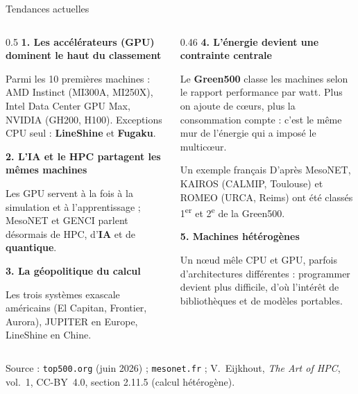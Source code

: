 \documentclass[8pt,aspectratio=169]{beamer}
\newcommand{\src}[1]{\vfill{\tiny\color{gray}Source : #1\par}}
\newcommand{\eij}{V.~Eijkhout, \emph{The Art of HPC}, vol.~1, CC-BY~4.0}
\begin{document}
\begin{frame}{Tendances actuelles}
\begin{columns}[T]
\begin{column}{0.5\textwidth}
\textbf{1. Les accélérateurs (GPU) dominent le haut du classement}

\smallskip
Parmi les 10 premières machines : AMD Instinct (MI300A, MI250X), Intel Data Center GPU Max, NVIDIA (GH200, H100). Exceptions CPU seul : \textbf{LineShine} et \textbf{Fugaku}.

\medskip
\textbf{2. L'IA et le HPC partagent les mêmes machines}

\smallskip
Les GPU servent à la fois à la simulation et à l'apprentissage ; MesoNET et GENCI parlent désormais de HPC, d'\textbf{IA} et de \textbf{quantique}.

\medskip
\textbf{3. La géopolitique du calcul}

\smallskip
Les trois systèmes exascale américains (El Capitan, Frontier, Aurora), JUPITER en Europe, LineShine en Chine.
\end{column}
\begin{column}{0.46\textwidth}
\textbf{4. L'énergie devient une contrainte centrale}

\smallskip
Le \textbf{Green500} classe les machines selon le rapport performance par watt. Plus on ajoute de cœurs, plus la consommation compte : c'est le même \og mur de l'énergie \fg{} qui a imposé le multicœur.

\medskip
\begin{exampleblock}{Un exemple français}
D'après MesoNET, KAIROS (CALMIP, Toulouse) et ROMEO (URCA, Reims) ont été classés 1\textsuperscript{er} et 2\textsuperscript{e} de la Green500.
\end{exampleblock}

\medskip
\textbf{5. Machines hétérogènes}

\smallskip
Un nœud mêle CPU et GPU, parfois d'architectures différentes : programmer devient plus difficile, d'où l'intérêt de bibliothèques et de modèles portables.
\end{column}
\end{columns}
\src{\texttt{top500.org} (juin 2026) ; \texttt{mesonet.fr} ; \eij{}, section 2.11.5 (calcul hétérogène).}
\end{frame}
\end{document}
